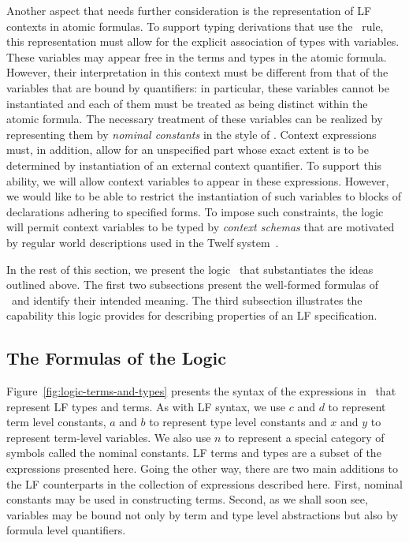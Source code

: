 Another aspect that needs further consideration is the representation of
LF contexts in atomic formulas.
%
To support typing derivations that use the
\canontermlam\ rule, this representation must allow for the explicit
association of types with variables.
%
These variables may appear free in the terms and types in the atomic
formula.
%
However, their interpretation in this context must be different from
that of the variables that are bound by quantifiers: in particular, these
variables cannot be instantiated and each of them must be treated as
being distinct within the atomic formula. 
%
The necessary treatment of these variables can be realized by
representing them by \emph{nominal constants} in the style of
\cite{gacek11ic,tiu06lfmtp}.
%
Context expressions must, in addition, allow for an unspecified part
whose exact extent is to be determined by instantiation of an external
context quantifier.
%
To support this ability, we will allow context variables to appear in
these expressions.
%
However, we would like to be able to restrict the instantiation of
such variables to blocks of declarations adhering to specified forms.
%
To impose such constraints, the logic will permit context variables to
be typed by \emph{context schemas} that are motivated by regular world
descriptions used in the Twelf
system~\cite{Pfenning02guide,schurmann00phd}. 

In the rest of this section, we present the logic \logic\ that
substantiates the ideas outlined above.
%
The first two subsections present the well-formed formulas of \logic\ and
identify their intended meaning. 
%
%
The third subsection illustrates the capability this logic provides
for describing properties of an LF specification. 

\subsection{The Formulas of the Logic}\label{ssec:formulas}

Figure~\ref{fig:logic-terms-and-types} presents the syntax of the
expressions in \logic\ that represent LF types and terms.
%
As with LF syntax, we use $c$ and $d$ to represent term level
constants, $a$ and $b$ to represent type level constants and $x$ and
$y$ to represent term-level variables.
%
We also use $n$ to represent a special category of symbols called the
nominal constants.
%
LF terms and types are a subset of the expressions presented
here.
%
Going the other way, there are two main additions to the LF
counterparts in the collection of expressions described here.
%
First, nominal constants may be used in constructing terms.
%
Second, as we shall soon see, variables may be bound not only by
term and type level abstractions but also by formula level
quantifiers.

